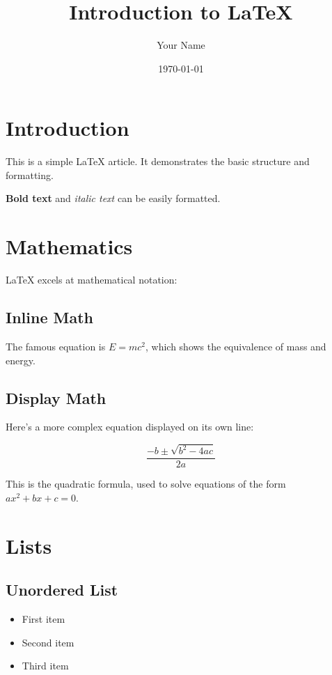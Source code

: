 \documentclass{article}
\title{Introduction to \LaTeX{}}
\author{Your Name}
\date{\today}
\begin{document}
\maketitle

\section{Introduction}

This is a simple \LaTeX{} article. It demonstrates the basic structure and formatting.

\textbf{Bold text} and \textit{italic text} can be easily formatted.

\section{Mathematics}

\LaTeX{} excels at mathematical notation:

\subsection{Inline Math}

The famous equation is $E = mc^2$, which shows the equivalence of mass and energy.

\subsection{Display Math}

Here's a more complex equation displayed on its own line:

$$\frac{-b \pm \sqrt{b^2 - 4ac}}{2a}$$

This is the quadratic formula, used to solve equations of the form $ax^2 + bx + c = 0$.

\section{Lists}

\subsection{Unordered List}
\begin{itemize}
    \item First item
    \item Second item
    \item Third item
\end{itemize}
\end{document}
